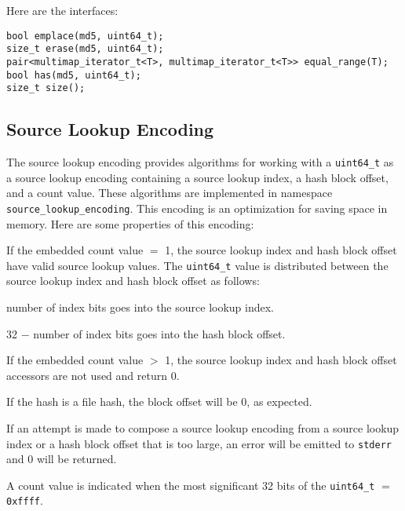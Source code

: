 \documentclass[12pt,twoside]{article}
\begin{document}
Here are the interfaces:
\begin{small}
\begin{verbatim}
bool emplace(md5, uint64_t);
size_t erase(md5, uint64_t);
pair<multimap_iterator_t<T>, multimap_iterator_t<T>> equal_range(T);
bool has(md5, uint64_t);
size_t size();
\end{verbatim}
\end{small}

\subsection{Source Lookup Encoding}
The source lookup encoding provides algorithms for working with a
\texttt{uint64\_t}
as a source lookup encoding containing a source lookup index,
a hash block offset, and a count value.
These algorithms are
implemented in namespace \texttt{source\_lookup\_encoding}.
This encoding is an optimization for saving space in memory.
Here are some properties of this encoding:
\begin{compactitem}
\item If the embedded count value $=$ 1,
the source lookup index and hash block offset
have valid source lookup values.
The \texttt{uint64\_t} value is distributed between the
source lookup index and hash block offset as follows:
  \begin{compactitem}
  \item number of index bits goes into the source lookup index.
  \item 32 $-$ number of index bits goes into the hash block offset.
  \end{compactitem}
\item If the embedded count value $>$ 1,
the source lookup index and hash block offset accessors
are not used and return 0.
\item If the hash is a file hash, the block offset will be 0, as expected.
\item If an attempt is made to compose a source lookup encoding
from a source lookup index or a hash block offset
that is too large, an error will be emitted to \texttt{stderr}
and 0 will be returned.
\item A count value is indicated when the most significant 32 bits
of the \texttt{uint64\_t} $=$ \texttt{0xffff}.
\end{compactitem}

\end{document}
